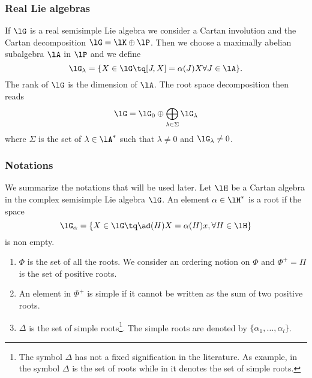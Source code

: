 \subsubsection{Real Lie algebras}

If \( \lG\) is a real semisimple Lie algebra we consider a Cartan involution and the Cartan decomposition \( \lG=\lK\oplus\lP\). Then we choose a maximally abelian subalgebra \( \lA\) in \( \lP\) and we define
\begin{equation}
	\lG_{\lambda}=\{ X\in\lG\tq [J,X]=\alpha(J)X \forall J\in\lA \}.
\end{equation}
The rank of \( \lG\) is the dimension of \( \lA\). The root space decomposition then reads
\begin{equation}
	\lG=\lG_0\oplus\bigoplus_{\lambda\in\Sigma}\lG_{\lambda}
\end{equation}
where \( \Sigma\) is the set of \( \lambda\in\lA^*\) such that \( \lambda\neq 0\) and \( \lG_{\lambda}\neq 0\).

\subsubsection{Notations}
\label{SubsecNotationRootsDel}

We summarize the notations that will be used later. Let \( \lH\) be a Cartan algebra in the complex semisimple Lie algebra \( \lG\). An element \( \alpha\in\lH^*\) is a root if the space
\begin{equation}
	\lG_{\alpha}=\{ X\in\lG\tq \ad(H)X=\alpha(H)x,\forall H\in\lH \}
\end{equation}
is non empty.

\begin{enumerate}
	\item
	      \( \Phi\) is the set of all the roots. We consider an ordering notion on \( \Phi\) and \( \Phi^+=\Pi\) is the set of positive roots.
	\item
	      An element in \( \Phi^+\) is simple if it cannot be written as the sum of two positive roots.
	\item
	      \( \Delta\) is the set of simple roots\footnote{The symbol \( \Delta\) has not a fixed signification in the literature. As example, in \cite{Cornwell} the symbol \( \Delta\) is the set of roots while in \cite{SternLieAlgebra} it denotes the set of simple roots.}. The simple roots are denoted by \( \{ \alpha_1,\ldots,\alpha_l \}\).
\end{enumerate}

